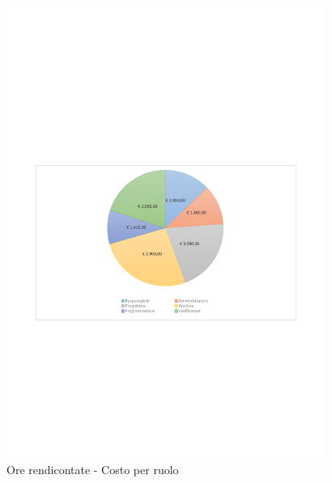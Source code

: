 \documentclass[../PianoProgetto.tex]{subfiles}
\begin{document}
	\begin{figure}[H]
		\centering
		\includegraphics[width=0.93\textwidth , trim=1.5cm 9cm 1.5cm 9cm]{grafici/Riepilogo/Rendicontate/costo}
			\caption{Ore rendicontate - Costo per ruolo}
		\label{fig:CircleChart-rendicontate_costo}
	\end{figure}
\vfill			
\end{document}
